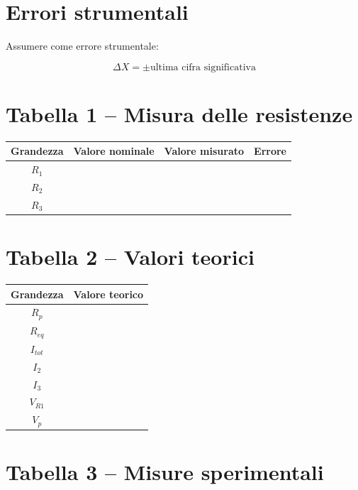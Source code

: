 \documentclass[a4paper,12pt]{article}
\begin{document}
\section*{Errori strumentali}

Assumere come errore strumentale:

\[
\Delta X = \pm \text{ultima cifra significativa}
\]

\vspace{0.5cm}

\section*{Tabella 1 -- Misura delle resistenze}

\begin{center}
\begin{tabular}{|c|c|c|c|}
\hline
Grandezza & Valore nominale & Valore misurato & Errore \\
\hline
$R_1$ & & & \\
\hline
$R_2$ & & & \\
\hline
$R_3$ & & & \\
\hline
\end{tabular}
\end{center}

\vspace{1cm}

\section*{Tabella 2 -- Valori teorici}

\begin{center}
\begin{tabular}{|c|c|}
\hline
Grandezza & Valore teorico \\
\hline
$R_p$ & \\
\hline
$R_{eq}$ & \\
\hline
$I_{tot}$ & \\
\hline
$I_2$ & \\
\hline
$I_3$ & \\
\hline
$V_{R1}$ & \\
\hline
$V_p$ & \\
\hline
\end{tabular}
\end{center}

\vspace{1cm}

\section*{Tabella 3 -- Misure sperimentali}
\end{document}
